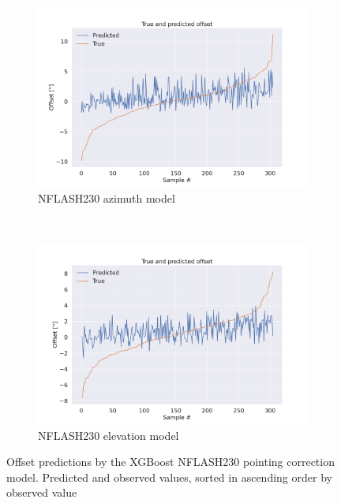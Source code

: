 \begin{figure}[H]
    \centering
    \begin{subfigure}[t]{\textwidth}
        \centering
        \includegraphics[width=\textwidth]{Results/sortpred_XGB_ds2_tp5_k30_uncorr_az_test.pdf}
        \caption{NFLASH230 azimuth model}
        \label{subfig:sortpred_lastfold_nflash230_az}
    \end{subfigure}
    \\
    \begin{subfigure}[t]{\textwidth}
       \centering
       \includegraphics[width=1\textwidth]{Results/sortpred_XGB_ds2_tp5_k40_uncorr_el_test.pdf}
       \caption{NFLASH230 elevation model}
       \label{subfig:sortpred_lastfold_nflash230_el}
    \end{subfigure}
    \caption{Offset predictions by the XGBoost NFLASH230 pointing correction model. Predicted and observed values, sorted in ascending order by observed value}
    \label{fig:sortpred_selected_result_xgb}
\end{figure}


